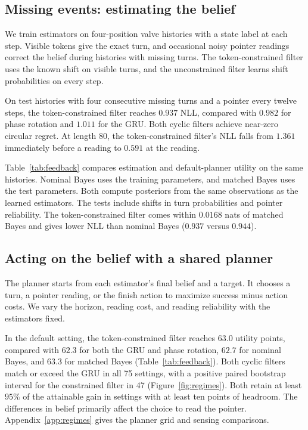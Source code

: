 

\subsection{Missing events: estimating the belief}
\label{sec:feedback}
We train estimators on four-position valve histories with a state label at
each step. Visible tokens give the exact turn, and occasional noisy pointer
readings correct the belief during histories with missing turns. The
token-constrained filter uses the known shift on visible turns, and the
unconstrained filter learns shift probabilities on every step.

On test histories with four consecutive missing turns and a pointer every
twelve steps, the token-constrained filter reaches $0.937$ NLL, compared with
$0.982$ for phase rotation and $1.011$ for the GRU. Both cyclic filters
achieve near-zero circular regret. At length 80, the token-constrained
filter's NLL falls from $1.361$ immediately before a reading to $0.591$
at the reading.

Table~\ref{tab:feedback} compares estimation and default-planner utility
on the same histories. Nominal Bayes uses the training parameters, and
matched Bayes uses the test parameters. Both compute posteriors from the
same observations as the learned estimators. The tests include shifts in
turn probabilities and pointer reliability. The token-constrained filter
comes within $0.0168$ nats of matched Bayes and gives lower NLL than
nominal Bayes ($0.937$ versus $0.944$).



\subsection{Acting on the belief with a shared planner}
\label{sec:regimes}
The planner starts from each estimator's final belief and a target. It
chooses a turn, a pointer reading, or the finish action to maximize success
minus action costs. We vary the horizon, reading cost, and reading reliability
with the estimators fixed.

In the default setting, the token-constrained filter reaches $63.0$ utility
points, compared with $62.3$ for both the GRU and phase rotation, $62.7$
for nominal Bayes, and $63.3$ for matched Bayes (Table~\ref{tab:feedback}).
Both cyclic filters match or exceed the GRU in all
75 settings, with a positive paired bootstrap interval for the constrained
filter in 47 (Figure~\ref{fig:regimes}). Both retain at least $95\%$ of the
attainable gain in settings with at least ten points of headroom. The
differences in belief primarily affect the choice to read the pointer.
Appendix~\ref{app:regimes} gives the planner grid and sensing comparisons.

